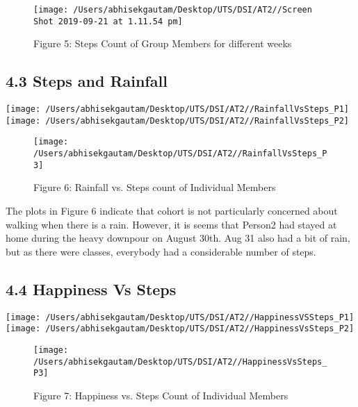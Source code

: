 \documentclass[
]{article}
\begin{document}
\begin{figure}

{\centering \texttt{[image: /Users/abhisekgautam/Desktop/UTS/DSI/AT2//Screen Shot 2019-09-21 at 1.11.54 pm]} 

}

\caption{\label{fig:figs}Figure 5: Steps Count of Group Members for different weeks}\label{fig:add_picture5}
\end{figure}

\hypertarget{steps-and-rainfall}{%
\subsection{4.3 Steps and Rainfall}\label{steps-and-rainfall}}

\texttt{[image: /Users/abhisekgautam/Desktop/UTS/DSI/AT2//RainfallVsSteps\_P1]}
\texttt{[image: /Users/abhisekgautam/Desktop/UTS/DSI/AT2//RainfallVsSteps\_P2]}

\begin{figure}

{\centering \texttt{[image: /Users/abhisekgautam/Desktop/UTS/DSI/AT2//RainfallVsSteps\_P3]} 

}

\caption{\label{fig:figs}Figure 6: Rainfall vs. Steps count of Individual Members}\label{fig:image_graphs99}
\end{figure}

The plots in Figure 6 indicate that cohort is not particularly concerned
about walking when there is a rain. However, it is seems that Person2
had stayed at home during the heavy downpour on August 30th. Aug 31 also
had a bit of rain, but as there were classes, everybody had a
considerable number of steps.

\hypertarget{happiness-vs-steps}{%
\subsection{4.4 Happiness Vs Steps}\label{happiness-vs-steps}}

\texttt{[image: /Users/abhisekgautam/Desktop/UTS/DSI/AT2//HappinessVSSteps\_P1]}
\texttt{[image: /Users/abhisekgautam/Desktop/UTS/DSI/AT2//HappinessVsSteps\_P2]}

\begin{figure}

{\centering \texttt{[image: /Users/abhisekgautam/Desktop/UTS/DSI/AT2//HappinessVsSteps\_P3]} 

}

\caption{\label{fig:figs}Figure 7: Happiness vs. Steps Count of Individual Members}\label{fig:image_graphs98}
\end{figure}
\end{document}
